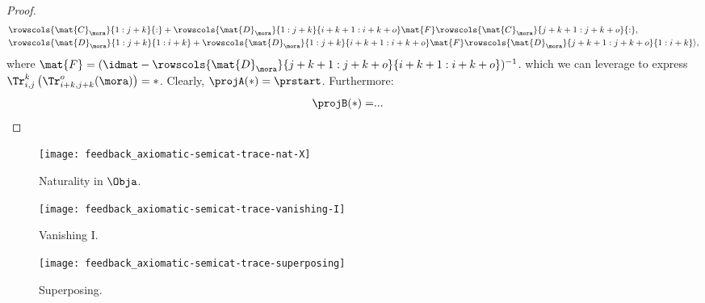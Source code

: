 {\begin{proof}
\begin{equation}
\begin{aligned}
                                                 & \rowscols{\mat{C}_\mora}{1:j+k}{:}+\rowscols{\mat{D}_\mora}{1:j+k}{i+k+1:i+k+o}\mat{F}\rowscols{\mat{C}_\mora}{j+k+1:j+k+o}{:}, \\
                                                 & \rowscols{\mat{D}_\mora}{1:j+k}{1:i+k}+\rowscols{\mat{D}_\mora}{1:j+k}{i+k+1:i+k+o}\mat{F} \rowscols{\mat{D}_\mora}{j+k+1:j+k+o}{1:i+k}\rangle,
            \end{aligned}
        \end{equation}
        where $\mat{F}=(\idmat-\rowscols{\mat{D}_\mora}{j+k+1:j+k+o}{i+k+1:i+k+o})^{-1}$.
        which we can leverage to express $\Tr_{i,j}^{k}\left(\Tr_{i+k,j+k}^o(\mora)\right)=\ast$.
        Clearly, $\projA(\ast)=\prstart$.
        Furthermore:
        \begin{equation*}
            \begin{aligned}
                \projB(\ast)= & .
                ..
            \end{aligned}
        \end{equation*}

    \end{proof}}

\begin{figure}[h!]
    \centering
    \texttt{[image: feedback\_axiomatic-semicat-trace-nat-X]}
    \caption{Naturality in $\Obja$.}
    \label{fig:axiomatic-semicat-trace-nat-X}
\end{figure}

\begin{figure}[h!]
    \centering
    \texttt{[image: feedback\_axiomatic-semicat-trace-vanishing-I]}
    \caption{Vanishing I.}
    \label{fig:axiomatic-semicat-trace-vanishing-I}
\end{figure}

\begin{figure}[h!]
    \centering
    \texttt{[image: feedback\_axiomatic-semicat-trace-superposing]}
    \caption{Superposing.}
    \label{fig:axiomatic-semicat-trace-superposing}
\end{figure}

